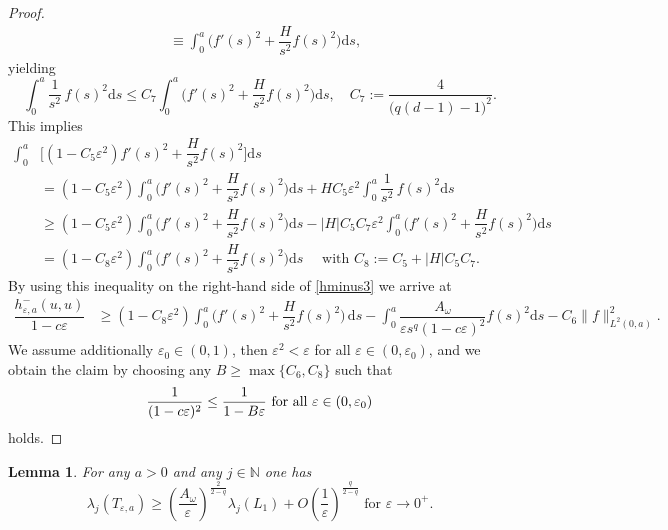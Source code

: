 \documentclass[11pt,oneside,reqno,a4paper]{amsart}
\newcommand{\dd}{\mathrm{d}}
\newcommand{\N}{\mathbb{N}}
\newcommand{\eps}{\varepsilon}
\newtheorem{lemma}[theorem]{Lemma}
\theoremstyle{definition}
\begin{document}
\begin{proof}
\begin{align*}
&\equiv \int_0^a \bigg(f'(s)^2+\dfrac{H}{s^2}f(s)^2\bigg)\dd s,
\end{align*}
yielding
\[
\int_0^a \dfrac{1}{s^2}\, f(s)^2\dd s\le C_7 \int_0^a \bigg(f'(s)^2+\dfrac{H}{s^2}f(s)^2\bigg)\dd s,
\quad C_7:=\dfrac{4}{\big(q(d-1)-1\big)^2}.
\]
This implies
\begin{align*}
\int_0^a&\bigg[(1-C_5\eps^2)f'(s)^2 +\dfrac{H}{s^2} f(s)^2\bigg]\dd s\\
&=(1-C_5\eps^2)\int_0^a\bigg(f'(s)^2+\dfrac{H}{s^2}f(s)^2\bigg)\dd s +H C_5 \eps^2 \int_0^a \dfrac{1}{s^2}\, f(s)^2\dd s\\
&\ge (1-C_5\eps^2)\int_0^a\bigg(f'(s)^2+\dfrac{H}{s^2}f(s)^2\bigg)\dd s- |H|C_5C_7\eps^2 \int_0^a \bigg(f'(s)^2+\dfrac{H}{s^2}f(s)^2\bigg)\dd s\\
&= (1-C_8\eps^2)\int_0^a\bigg(f'(s)^2+\dfrac{H}{s^2}f(s)^2\bigg)\dd s\quad
\text{ with }C_8:=C_5+|H|C_5C_7.
\end{align*}
By using this inequality on the right-hand side of \eqref{hminus3} we arrive at
\begin{align*}
	\dfrac{h^-_{\eps,a}(u,u)}{1-c\eps}&\ge (1-C_8\eps^2)\int_0^a\bigg(f'(s)^2 +\dfrac{H}{s^2}f(s)^2\bigg)\,\dd s-\int_0^a\dfrac{A_\omega}{\eps s^q (1-c\eps)^2}	f(s)^2\dd s
-C_6\|f\|^2_{L^2(0,a)}.
\end{align*}
We assume additionally $\eps_0\in(0,1)$, then $\eps^2<\eps$ for all $\eps\in(0,\eps_0)$, and we obtain the claim by choosing any $B\ge \max\{C_6,C_8\}$ such that
\[
\dfrac{1}{(1-c\eps)^2}\le\dfrac{1}{1-B\eps} \text{ for all }\eps\in(0,\eps_0) \qedhere
\]
holds.
\end{proof}


\begin{lemma}\label{lem12}
For any $a>0$ and any $j\in\N$ one has
\[
\lambda_j(T_{\eps,a})\geq \left(\dfrac{A_\omega}{\eps}\right)^{\frac{2}{2-q}}\lambda_j(L_1)+O\left(\dfrac{1}{\eps}\right)^{\frac{q}{2-q}} \text{ for }\eps\to 0^+.
\]
\end{lemma}
\end{document}
